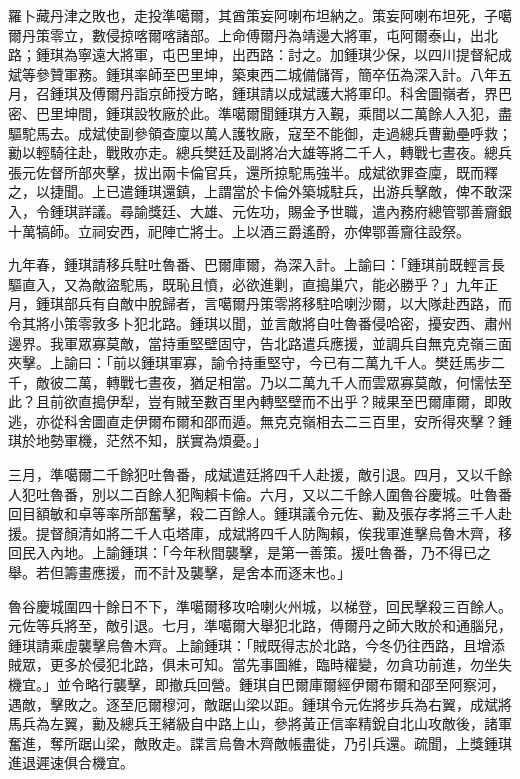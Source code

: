 \begin{pinyinscope}
羅卜藏丹津之敗也，走投準噶爾，其酋策妄阿喇布坦納之。策妄阿喇布坦死，子噶爾丹策零立，數侵掠喀爾喀諸部。上命傅爾丹為靖邊大將軍，屯阿爾泰山，出北路；鍾琪為寧遠大將軍，屯巴里坤，出西路：討之。加鍾琪少保，以四川提督紀成斌等參贊軍務。鍾琪率師至巴里坤，築東西二城備儲胥，簡卒伍為深入計。八年五月，召鍾琪及傅爾丹詣京師授方略，鍾琪請以成斌護大將軍印。科舍圖嶺者，界巴密、巴里坤間，鍾琪設牧廠於此。準噶爾聞鍾琪方入覲，乘間以二萬餘人入犯，盡驅駝馬去。成斌使副參領查廩以萬人護牧廠，寇至不能御，走過總兵曹勷壘呼救；勷以輕騎往赴，戰敗亦走。總兵樊廷及副將冶大雄等將二千人，轉戰七晝夜。總兵張元佐督所部夾擊，拔出兩卡倫官兵，還所掠駝馬強半。成斌欲罪查廩，既而釋之，以捷聞。上已遣鍾琪還鎮，上謂當於卡倫外築城駐兵，出游兵擊敵，俾不敢深入，令鍾琪詳議。尋諭獎廷、大雄、元佐功，賜金予世職，遣內務府總管鄂善齎銀十萬犒師。立祠安西，祀陣亡將士。上以酒三爵遙酹，亦俾鄂善齎往設祭。

九年春，鍾琪請移兵駐吐魯番、巴爾庫爾，為深入計。上諭曰：「鍾琪前既輕言長驅直入，又為敵盜駝馬，既恥且憤，必欲進剿，直搗巢穴，能必勝乎？」九年正月，鍾琪部兵有自敵中脫歸者，言噶爾丹策零將移駐哈喇沙爾，以大隊赴西路，而令其將小策零敦多卜犯北路。鍾琪以聞，並言敵將自吐魯番侵哈密，擾安西、肅州邊界。我軍眾寡莫敵，當持重堅壁固守，告北路遣兵應援，並調兵自無克克嶺三面夾擊。上諭曰：「前以鍾琪軍寡，諭令持重堅守，今已有二萬九千人。樊廷馬步二千，敵彼二萬，轉戰七晝夜，猶足相當。乃以二萬九千人而雲眾寡莫敵，何懦怯至此？且前欲直搗伊犁，豈有賊至數百里內轉堅壁而不出乎？賊果至巴爾庫爾，即敗逃，亦從科舍圖直走伊爾布爾和邵而遁。無克克嶺相去二三百里，安所得夾擊？鍾琪於地勢軍機，茫然不知，朕實為煩憂。」

三月，準噶爾二千餘犯吐魯番，成斌遣廷將四千人赴援，敵引退。四月，又以千餘人犯吐魯番，別以二百餘人犯陶賴卡倫。六月，又以二千餘人圍魯谷慶城。吐魯番回目額敏和卓等率所部奮擊，殺二百餘人。鍾琪議令元佐、勷及張存孝將三千人赴援。提督顏清如將二千人屯塔庫，成斌將四千人防陶賴，俟我軍進擊烏魯木齊，移回民入內地。上諭鍾琪：「今年秋間襲擊，是第一善策。援吐魯番，乃不得已之舉。若但籌畫應援，而不計及襲擊，是舍本而逐末也。」

魯谷慶城圍四十餘日不下，準噶爾移攻哈喇火州城，以梯登，回民擊殺三百餘人。元佐等兵將至，敵引退。七月，準噶爾大舉犯北路，傅爾丹之師大敗於和通腦兒，鍾琪請乘虛襲擊烏魯木齊。上諭鍾琪：「賊既得志於北路，今冬仍往西路，且增添賊眾，更多於侵犯北路，俱未可知。當先事圖維，臨時權變，勿貪功前進，勿坐失機宜。」並令略行襲擊，即撤兵回營。鍾琪自巴爾庫爾經伊爾布爾和邵至阿察河，遇敵，擊敗之。逐至厄爾穆河，敵踞山梁以距。鍾琪令元佐將步兵為右翼，成斌將馬兵為左翼，勷及總兵王緒級自中路上山，參將黃正信率精銳自北山攻敵後，諸軍奮進，奪所踞山梁，敵敗走。諜言烏魯木齊敵帳盡徙，乃引兵還。疏聞，上獎鍾琪進退遲速俱合機宜。


\end{pinyinscope}
